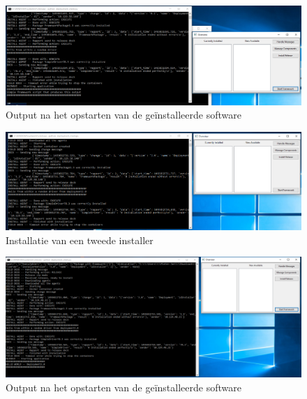 \begin{figure}
\centering
\includegraphics[width=\textwidth,height=\textheight,keepaspectratio]{afbeelding/testMultiClient/startFramework_cut.png}
\caption{Output na het opstarten van de geïnstalleerde software}
\label{fig:testClient:startFramework}
\end{figure}

\begin{figure}
\centering
\includegraphics[width=\textwidth,height=\textheight,keepaspectratio]{afbeelding/testMultiClient/NaDeployment2_cut.png}
\caption{Installatie van een tweede installer}
\label{fig:testClient:installDeployment2}
\end{figure}

\begin{figure}
\centering
\includegraphics[width=\textwidth,height=\textheight,keepaspectratio]{afbeelding/testMultiClient/StartNaDeployment2_cut.png}
\caption{Output na het opstarten van de geïnstalleerde software}
\label{fig:testClient:startFramework2}
\end{figure}

